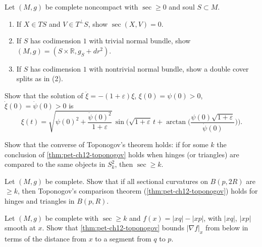 \begin{remark}[Exercise 12.8.2]
  \label{rem:pet-ch12-ex-12-8-2}
  Let $(M,g)$ be complete noncompact with $\sec\ge0$ and soul $S\subset M$.
  \begin{enumerate}
    \item If $X\in TS$ and $V\in T^\perp S$, show $\sec(X,V)=0$.
    \item If $S$ has codimension $1$ with trivial normal bundle, show
      $(M,g)=(S\times\mathbb{R},g_S+dr^2)$.
    \item If $S$ has codimension $1$ with nontrivial normal bundle, show a
      double cover splits as in (2).
  \end{enumerate}
\end{remark}

\begin{remark}[Exercise 12.8.3]
  \label{rem:pet-ch12-ex-12-8-3}
  Show that the solution of $\ddot\xi=-(1+\varepsilon)\xi$,
  $\xi(0)=\psi(0)>0$, $\dot\xi(0)=\dot\psi(0)>0$ is
  \[
    \xi(t)=\sqrt{\psi(0)^2+\frac{\dot\psi(0)^2}{1+\varepsilon}}\,
    \sin\Big(\sqrt{1+\varepsilon}\,t+\arctan\Big(\frac{\psi(0)\sqrt{1+\varepsilon}}{\dot\psi(0)}\Big)\Big).
  \]
\end{remark}

\begin{remark}[Exercise 12.8.4]
  \label{rem:pet-ch12-ex-12-8-4}
  Show that the converse of Toponogov's theorem holds: if for some $k$ the
  conclusion of \cref{thm:pet-ch12-toponogov} holds when hinges (or triangles)
  are compared to the same objects in $S_k^2$, then $\sec\ge k$.
\end{remark}

\begin{remark}[Exercise 12.8.5]
  \label{rem:pet-ch12-ex-12-8-5}
  Let $(M,g)$ be complete. Show that if all sectional curvatures on $B(p,2R)$
  are $\ge k$, then Toponogov's comparison theorem
  (\cref{thm:pet-ch12-toponogov}) holds for hinges and triangles in $B(p,R)$.
\end{remark}

\begin{remark}[Exercise 12.8.6]
  \label{rem:pet-ch12-ex-12-8-6}
  Let $(M,g)$ be complete with $\sec\ge k$ and $f(x)=|xq|-|xp|$, with $|xq|$,
  $|xp|$ smooth at $x$. Show that \cref{thm:pet-ch12-toponogov} bounds
  $|\nabla f|_x$ from below in terms of the distance from $x$ to a segment from
  $q$ to $p$.
\end{remark}

